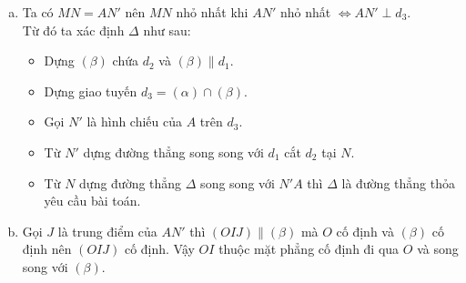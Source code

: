 \begin{ex}
{\begin{enumerate}[a)]
			Từ $(1)$, $(2)$ suy ra $AMNN'$ là hình bình  hành.\\
			Gọi $(\beta)$ là mặt phẳng chứa $d_2$ và song song với $d_1$ thì $NN'\subset (\beta)\Rightarrow N'\in (\beta)$ từ đó ta có $N'$ thuộc giao tuyến $d_3$ của $(\alpha)$ và $(\beta)$. 
			\item Ta có $MN=AN'$ nên $MN$ nhỏ nhất khi $AN'$ nhỏ  nhất $\Leftrightarrow AN'\perp d_3$.\\
			 Từ đó ta xác định $\Delta $ như sau:
			\begin{itemize}
				\item Dựng  $(\beta)$ chứa $d_2$ và $(\beta)\parallel d_1$.
				\item Dựng giao tuyến $d_3=(\alpha)\cap (\beta)$. 
				\item Gọi $N'$  là hình chiếu của $A$ trên $d_3$.
				\item Từ $N'$ dựng đường  thẳng song song với $d_1$ cắt $d_2$ tại $N$.
				\item Từ $N$  dựng đường thẳng $\Delta $ song song với $N'A$ thì $\Delta $ là đường thẳng thỏa yêu cầu bài toán.
			\end{itemize}
			\item Gọi $J$ là trung điểm  của $AN'$ thì $(OIJ)\parallel (\beta)$ mà $O$ cố định và $(\beta)$ cố định nên $(OIJ)$ cố định. Vậy $OI$ thuộc mặt phẳng cố định đi qua $O$ và song song với $(\beta)$.
		\end{enumerate}
	} 
\end{ex}

